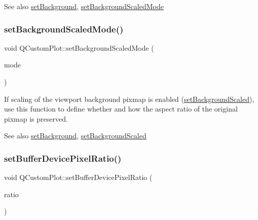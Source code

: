 \begin{DoxySeeAlso}{See also}
\mbox{\hyperlink{class_q_custom_plot_a130358592cfca353ff3cf5571b49fb00}{set\+Background}}, \mbox{\hyperlink{class_q_custom_plot_a4c0eb4865b7949f62e1cb97db04a3de0}{set\+Background\+Scaled\+Mode}} 
\end{DoxySeeAlso}
\mbox{\label{class_q_custom_plot_a4c0eb4865b7949f62e1cb97db04a3de0}} 
\subsubsection{\texorpdfstring{set\+Background\+Scaled\+Mode()}{setBackgroundScaledMode()}}
{\footnotesize\ttfamily void Q\+Custom\+Plot\+::set\+Background\+Scaled\+Mode (\begin{DoxyParamCaption}\item[{Qt\+::\+Aspect\+Ratio\+Mode}]{mode }\end{DoxyParamCaption})}

If scaling of the viewport background pixmap is enabled (\mbox{\hyperlink{class_q_custom_plot_a36f0fa1317325dc7b7efea615ee2de1f}{set\+Background\+Scaled}}), use this function to define whether and how the aspect ratio of the original pixmap is preserved.

\begin{DoxySeeAlso}{See also}
\mbox{\hyperlink{class_q_custom_plot_a130358592cfca353ff3cf5571b49fb00}{set\+Background}}, \mbox{\hyperlink{class_q_custom_plot_a36f0fa1317325dc7b7efea615ee2de1f}{set\+Background\+Scaled}} 
\end{DoxySeeAlso}
\mbox{\label{class_q_custom_plot_a159162653ad6f8b8bf21263ba5787215}} 
\subsubsection{\texorpdfstring{set\+Buffer\+Device\+Pixel\+Ratio()}{setBufferDevicePixelRatio()}}
{\footnotesize\ttfamily void Q\+Custom\+Plot\+::set\+Buffer\+Device\+Pixel\+Ratio (\begin{DoxyParamCaption}\item[{double}]{ratio }\end{DoxyParamCaption})}

